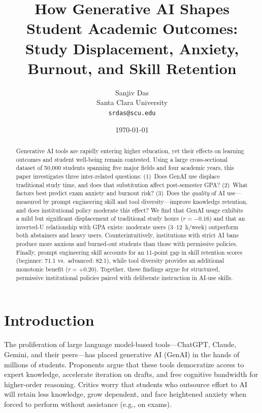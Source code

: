 \documentclass[11pt]{article}
\title{\textbf{How Generative AI Shapes Student Academic Outcomes:\\
Study Displacement, Anxiety, Burnout, and Skill Retention}}
\author{Sanjiv Das\\
Santa Clara University\\
\texttt{srdas@scu.edu}}
\date{\today}
\begin{document}
\maketitle

\begin{abstract}
Generative AI tools are rapidly entering higher education, yet their effects on
learning outcomes and student well-being remain contested. Using a large
cross-sectional dataset of 50{,}000 students spanning five major fields and four
academic years, this paper investigates three inter-related questions: (1)~Does
GenAI use displace traditional study time, and does that substitution affect
post-semester GPA? (2)~What factors best predict exam anxiety and burnout risk?
(3)~Does the \emph{quality} of AI use---measured by prompt engineering skill and
tool diversity---improve knowledge retention, and does institutional policy
moderate this effect? We find that GenAI usage exhibits a mild but significant
displacement of traditional study hours ($r = -0.16$) and that an inverted-U
relationship with GPA exists: moderate users (3--12~h/week) outperform both
abstainers and heavy users. Counterintuitively, institutions with strict AI bans
produce more anxious and burned-out students than those with permissive policies.
Finally, prompt engineering skill accounts for an 11-point gap in skill retention
scores (beginner: 71.1 vs.\ advanced: 82.1), while tool diversity provides an
additional monotonic benefit ($r = +0.20$). Together, these findings argue for
structured, permissive institutional policies paired with deliberate instruction
in AI-use skills.
\end{abstract}

\section{Introduction}

The proliferation of large language model-based tools---ChatGPT, Claude, Gemini,
and their peers---has placed generative AI (GenAI) in the hands of millions of
students. Proponents argue that these tools democratize access to expert
knowledge, accelerate iteration on drafts, and free cognitive bandwidth for
higher-order reasoning. Critics worry that students who outsource effort to AI
will retain less knowledge, grow dependent, and face heightened anxiety when
forced to perform without assistance (e.g., on exams).
\end{document}
